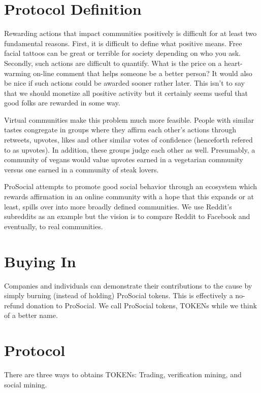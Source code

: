 \section{\textbf{Protocol Definition}}

Rewarding actions that impact communities positively is difficult for at least two fundamental reasons. First, it is difficult to define what positive means. Free facial tattoos can be great or terrible for society depending on who you ask. Secondly, such actions are difficult to quantify. What is the price on a heart-warming on-line comment that helps someone be a better person? It would also be nice if such actions could be awarded sooner rather later. This isn't to say that we should monetize all positive activity but it certainly seems useful that good folks are rewarded in some way.

Virtual communities make this problem much more feasible. People with similar tastes congregate in groups where they affirm each other's actions through retweets, upvotes, likes and other similar votes of confidence (henceforth refered to as upvotes). In addition, these groups judge each other as well. Presumably, a community of vegans would value upvotes earned in a vegetarian community versus one earned in a community of steak lovers. 

ProSocial attempts to promote good social behavior through an ecosystem which rewards affirmation in an online community with a hope that this expands or at least, spills over into more broadly defined communities. We use Reddit's subreddits as an example but the vision is to compare Reddit to Facebook and eventually, to real communities.

\section*{Buying In}

Companies and individuals can demonstrate their contributions to the cause by simply burning (instead of holding) ProSocial tokens. This is effectively a no-refund donation to ProSocial. We call ProSocial tokens, TOKENs while we think of a better name. 

\section*{Protocol}

There are three ways to obtains TOKENs: Trading, verification mining, and social mining. 

